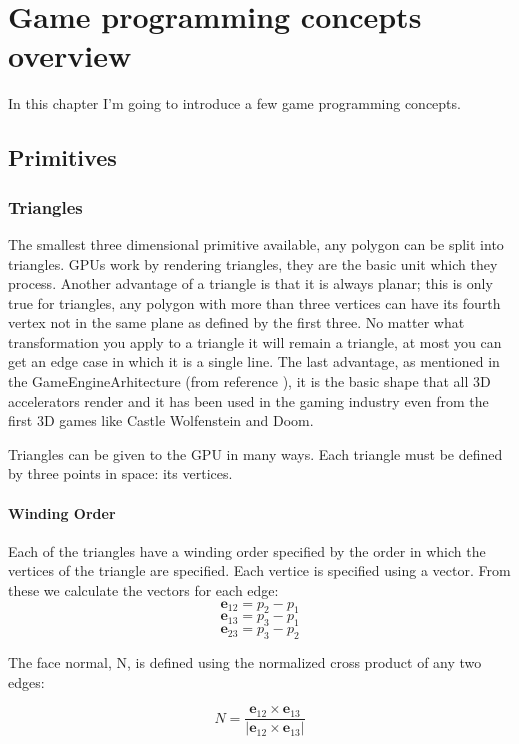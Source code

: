 \chapter{Game programming concepts overview}
\label{chapter:Chapter 3}

In this chapter I’m going to introduce a few game programming concepts.

\section{Primitives}

\subsection{Triangles}

The smallest three dimensional primitive available, any polygon can be split into triangles. GPUs work by rendering triangles, they are the basic unit which they process. Another advantage of a triangle is that it is always planar; this is only true for triangles, any polygon with more than three vertices can have its fourth vertex not in the same plane as defined by the first three. No matter what transformation you apply to a triangle it will remain a triangle, at most you can get an edge case in which it is a single line.
The last advantage, as mentioned in the GameEngineArhitecture (from reference \cite{gregory09}), it is the basic shape that all 3D accelerators render and it has been used in the gaming industry even from the first 3D games like Castle Wolfenstein and Doom.

Triangles can be given to the GPU in many ways. Each triangle must be defined by three points in space: its vertices.

\subsubsection{Winding Order}

Each of the triangles have a winding order specified by the order in which the vertices of the triangle are specified. Each vertice is specified using a vector. From these we calculate the vectors for each edge:
\[ \mathbf{e}_{12} = p_{2} - p_{1}\]
\[ \mathbf{e}_{13} = p_{3} - p_{1}\]
\[\mathbf{e}_{23} = p_{3} - p_{2}\]

The face normal, N, is defined using the normalized cross product of any two edges:

\[ N = \frac{\mathbf{e}_{12}\times \mathbf{e}_{13}}{\left | \mathbf{e}_{12}\times \mathbf{e}_{13}  \right |}\]

